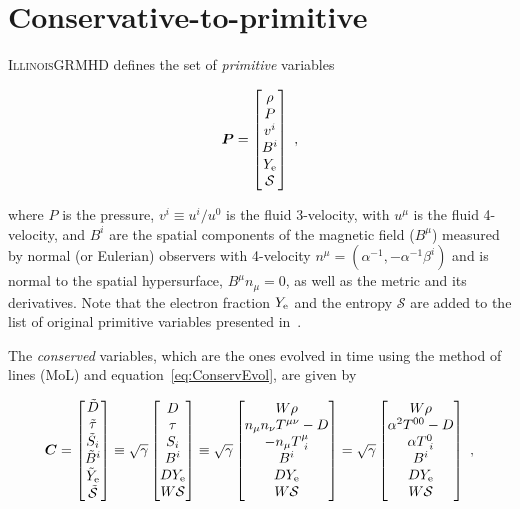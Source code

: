 \documentclass{article}
\newcommand{\igm}{\textsc{IllinoisGRMHD}\xspace}
\newcommand{\primv}{\bm{P}}
\newcommand{\consv}{\bm{C}}
\newcommand{\ye}{Y_{\rm e}}
\newcommand{\yet}{\tilde{Y}_{\rm e}}
\newcommand{\sqrtgamma}{\sqrt{\gamma}}
\newcommand{\ent}{\mathcal{S}}
\newcommand{\entstar}{\tilde{\ent}}
\newcommand{\eq}[1]{
\begin{equation}
    #1
\end{equation}
}
\begin{document}
\section{Conservative-to-primitive}

\igm defines the set of \emph{primitive} variables

\eq{
\primv = 
\begin{bmatrix}
\rho\\
P\\
v^{i}\\
B^{i}\\
\ye\\
\ent
\end{bmatrix}\ ,
}

\noindent where $P$ is the pressure, $v^{i} \equiv u^{i}/u^{0}$ is the fluid 3-velocity, with $u^{\mu}$ is the fluid 4-velocity, and $B^{i}$ are the spatial components of the magnetic field ($B^{\mu}$) measured by normal (or Eulerian) observers with 4-velocity $n^{\mu} = \left(\alpha^{-1},-\alpha^{-1}\beta^{i}\right)$ and is normal to the spatial hypersurface, $B^{\mu}n_{\mu}=0$, as well as the metric and its derivatives. Note that the electron fraction $\ye$ and the entropy $\ent$ are added to the list of original primitive variables presented in~\cite{etienne2015illinoisgrmhd}.

The \emph{conserved} variables, which are the ones evolved in time using the method of lines (MoL) and equation~\eqref{eq:ConservEvol}, are given by

\eq{
\consv = 
\begin{bmatrix}
\tilde{D}\\
\tilde{\tau}\\
\tilde{S}_{i}\\
\tilde{B}^{i}\\
\yet\\
\entstar
\end{bmatrix}
\equiv
\sqrtgamma
\begin{bmatrix}
D\\
\tau\\
S_{i}\\
B^{i}\\
D\ye\\
W \ent
\end{bmatrix}
\equiv
\sqrtgamma
\begin{bmatrix}
W\rho\\
n_{\mu}n_{\nu}T^{\mu\nu} - D\\
-n_{\mu}T^{\mu}_{\ i}\\
B^{i}\\
D\ye\\
W \ent
\end{bmatrix}
=
\sqrtgamma
\begin{bmatrix}
W\rho\\
\alpha^{2}T^{00} - D\\
\alpha T^{0}_{\ i}\\
B^{i}\\
D\ye\\
W \ent
\end{bmatrix}\ ,
}
\end{document}

